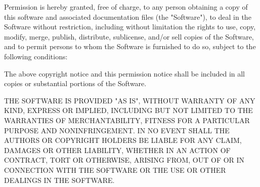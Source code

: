 \documentclass[11pt]{article}
\begin{document}
Permission is hereby granted, free of charge, to any person obtaining a copy
of this software and associated documentation files (the "Software"), to deal
in the Software without restriction, including without limitation the rights
to use, copy, modify, merge, publish, distribute, sublicense, and/or sell
copies of the Software, and to permit persons to whom the Software is
furnished to do so, subject to the following conditions:

The above copyright notice and this permission notice shall be included in
all copies or substantial portions of the Software.

THE SOFTWARE IS PROVIDED "AS IS", WITHOUT WARRANTY OF ANY KIND, EXPRESS OR
IMPLIED, INCLUDING BUT NOT LIMITED TO THE WARRANTIES OF MERCHANTABILITY,
FITNESS FOR A PARTICULAR PURPOSE AND NONINFRINGEMENT. IN NO EVENT SHALL THE
AUTHORS OR COPYRIGHT HOLDERS BE LIABLE FOR ANY CLAIM, DAMAGES OR OTHER
LIABILITY, WHETHER IN AN ACTION OF CONTRACT, TORT OR OTHERWISE, ARISING FROM,
OUT OF OR IN CONNECTION WITH THE SOFTWARE OR THE USE OR OTHER DEALINGS IN
THE SOFTWARE.
\end{document}
